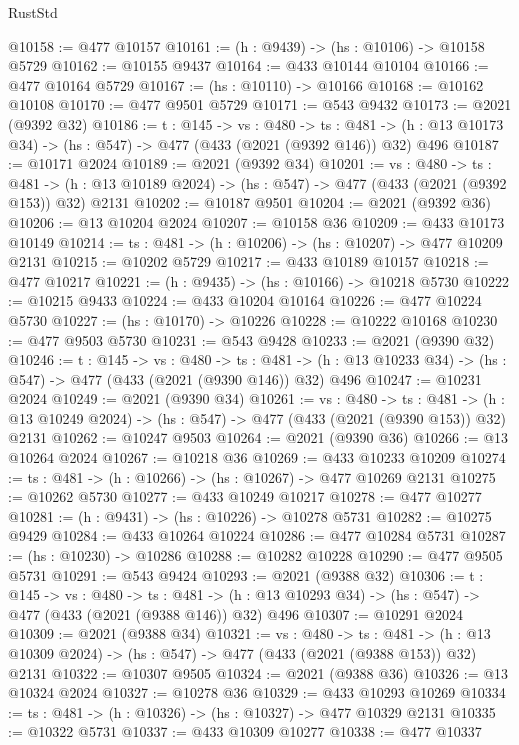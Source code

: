 \begin{lexlean}{RustStd}
\begin{coremodule}
{\begin{coremodule}
{{{{{{{{{{{{{{{{@10158 := @477 @10157
@10161 := (h : @9439) -> (hs : @10106) -> @10158 @5729
@10162 := @10155 @9437
@10164 := @433 @10144 @10104
@10166 := @477 @10164 @5729
@10167 := (hs : @10110) -> @10166
@10168 := @10162 @10108
@10170 := @477 @9501 @5729
@10171 := @543 @9432
@10173 := @2021 (@9392 @32)
@10186 := {t : @145} ->
  {vs : @480} ->
  {ts : @481} -> (h : @13 @10173 @34) -> (hs : @547) -> @477 (@433 (@2021 (@9392 @146)) @32) @496
@10187 := @10171 @2024
@10189 := @2021 (@9392 @34)
@10201 := {vs : @480} ->
  {ts : @481} -> (h : @13 @10189 @2024) -> (hs : @547) -> @477 (@433 (@2021 (@9392 @153)) @32) @2131
@10202 := @10187 @9501
@10204 := @2021 (@9392 @36)
@10206 := @13 @10204 @2024
@10207 := @10158 @36
@10209 := @433 @10173 @10149
@10214 := {ts : @481} -> (h : @10206) -> (hs : @10207) -> @477 @10209 @2131
@10215 := @10202 @5729
@10217 := @433 @10189 @10157
@10218 := @477 @10217
@10221 := (h : @9435) -> (hs : @10166) -> @10218 @5730
@10222 := @10215 @9433
@10224 := @433 @10204 @10164
@10226 := @477 @10224 @5730
@10227 := (hs : @10170) -> @10226
@10228 := @10222 @10168
@10230 := @477 @9503 @5730
@10231 := @543 @9428
@10233 := @2021 (@9390 @32)
@10246 := {t : @145} ->
  {vs : @480} ->
  {ts : @481} -> (h : @13 @10233 @34) -> (hs : @547) -> @477 (@433 (@2021 (@9390 @146)) @32) @496
@10247 := @10231 @2024
@10249 := @2021 (@9390 @34)
@10261 := {vs : @480} ->
  {ts : @481} -> (h : @13 @10249 @2024) -> (hs : @547) -> @477 (@433 (@2021 (@9390 @153)) @32) @2131
@10262 := @10247 @9503
@10264 := @2021 (@9390 @36)
@10266 := @13 @10264 @2024
@10267 := @10218 @36
@10269 := @433 @10233 @10209
@10274 := {ts : @481} -> (h : @10266) -> (hs : @10267) -> @477 @10269 @2131
@10275 := @10262 @5730
@10277 := @433 @10249 @10217
@10278 := @477 @10277
@10281 := (h : @9431) -> (hs : @10226) -> @10278 @5731
@10282 := @10275 @9429
@10284 := @433 @10264 @10224
@10286 := @477 @10284 @5731
@10287 := (hs : @10230) -> @10286
@10288 := @10282 @10228
@10290 := @477 @9505 @5731
@10291 := @543 @9424
@10293 := @2021 (@9388 @32)
@10306 := {t : @145} ->
  {vs : @480} ->
  {ts : @481} -> (h : @13 @10293 @34) -> (hs : @547) -> @477 (@433 (@2021 (@9388 @146)) @32) @496
@10307 := @10291 @2024
@10309 := @2021 (@9388 @34)
@10321 := {vs : @480} ->
  {ts : @481} -> (h : @13 @10309 @2024) -> (hs : @547) -> @477 (@433 (@2021 (@9388 @153)) @32) @2131
@10322 := @10307 @9505
@10324 := @2021 (@9388 @36)
@10326 := @13 @10324 @2024
@10327 := @10278 @36
@10329 := @433 @10293 @10269
@10334 := {ts : @481} -> (h : @10326) -> (hs : @10327) -> @477 @10329 @2131
@10335 := @10322 @5731
@10337 := @433 @10309 @10277
@10338 := @477 @10337
}}}}}}}}}}}}}}}}
\end{coremodule}}
\end{coremodule}
\end{lexlean}
